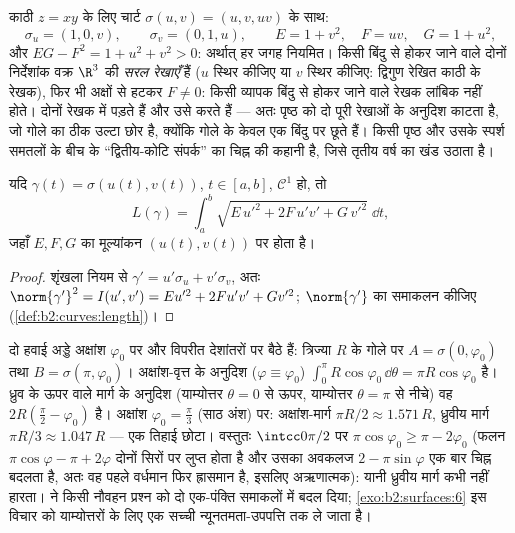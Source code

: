 \begin{example}[काठी वाला चार्ट]\label{ex:b2:surfaces:saddlechart}
काठी $z = xy$ के लिए चार्ट $\sigma(u, v) = (u, v,
uv)$ के साथ:
\[
\sigma_u = (1, 0, v), \qquad \sigma_v = (0, 1, u),
\qquad
E = 1 + v^2, \quad F = uv, \quad G = 1 + u^2 ,
\]
और $EG - F^2 = 1 + u^2 + v^2 > 0$: अर्थात् हर जगह नियमित। किसी बिंदु से होकर जाने वाले
दोनों निर्देशांक वक्र $\R^3$ की \emph{सरल रेखाएँ} हैं ($u$ स्थिर
कीजिए या $v$ स्थिर कीजिए: द्विगुण रेखित काठी के रेखक), फिर भी
अक्षों से हटकर $F \neq 0$: किसी व्यापक बिंदु से होकर जाने वाले रेखक
लांबिक नहीं होते। दोनों रेखक  में पड़ते हैं और उसे 
करते हैं --- अतः  पृष्ठ को दो पूरी रेखाओं के अनुदिश काटता
है, जो गोले का ठीक उल्टा छोर है, क्योंकि गोले के  केवल एक
बिंदु पर छूते हैं। किसी पृष्ठ और उसके स्पर्श समतलों के बीच के
``द्वितीय-कोटि संपर्क'' का चिह्न  की कहानी है, जिसे तृतीय वर्ष
का खंड उठाता है।
\end{example}

\begin{proposition}[पृष्ठ पर खींचे गए वक्र की
लंबाई]\label{prop:b2:surfaces:curvelength}
यदि $\gamma(t) = \sigma(u(t), v(t))$, $t \in [a, b]$, $\mathcal{C}^1$ हो, तो
\[
L(\gamma) = \int_a^b
\sqrt{E\,u'^2 + 2F\,u'v' + G\,v'^2}\;\dd t ,
\]
जहाँ $E, F, G$ का मूल्यांकन $(u(t), v(t))$ पर होता है।
\end{proposition}

\begin{proof}
शृंखला नियम से $\gamma' = u'\sigma_u + v'\sigma_v$, अतः
$\norm{\gamma'}^2 = I(u', v') = Eu'^2 + 2Fu'v' + Gv'^2$; $\norm{\gamma'}$ का समाकलन कीजिए
(\cref{def:b2:curves:length})।
\end{proof}

\begin{example}[हवाई जहाज़ ध्रुव के ऊपर से क्यों उड़ते हैं]\label{ex:b2:surfaces:polarroute}
दो हवाई अड्डे अक्षांश $\varphi_0$ पर और विपरीत देशांतरों पर बैठे हैं:
त्रिज्या $R$ के गोले पर $A = \sigma(0, \varphi_0)$ तथा $B = \sigma(\pi,
\varphi_0)$। अक्षांश-वृत्त के
अनुदिश ($\varphi \equiv \varphi_0$) 
$\int_0^\pi R\cos\varphi_0\,\dd\theta = \pi R\cos\varphi_0$ है। ध्रुव के ऊपर वाले मार्ग के अनुदिश (याम्योत्तर $\theta = 0$ से
ऊपर, याम्योत्तर $\theta = \pi$ से नीचे) वह $2R(\frac\pi2 -
\varphi_0)$ है। अक्षांश $\varphi_0 = \frac\pi3$ (साठ
अंश) पर: अक्षांश-मार्ग $\pi R/2 \approx 1.571\,R$, ध्रुवीय मार्ग
$\pi R/3 \approx 1.047\,R$ --- एक तिहाई छोटा। वस्तुतः $\intcc0{\pi/2}$ पर
$\pi\cos\varphi_0 \geq \pi - 2\varphi_0$ (फलन $\pi\cos\varphi - \pi +
2\varphi$ दोनों सिरों पर लुप्त होता है और उसका अवकलज
$2 -
\pi\sin\varphi$ एक बार चिह्न बदलता है, अतः वह पहले वर्धमान फिर ह्रासमान है,
इसलिए अऋणात्मक): यानी ध्रुवीय मार्ग कभी नहीं हारता।  ने किसी नौवहन प्रश्न को दो एक-पंक्ति समाकलों में बदल दिया;
\cref{exo:b2:surfaces:6} इस विचार को याम्योत्तरों के लिए एक सच्ची न्यूनतमता-उपपत्ति
तक ले जाता है।
\end{example}

